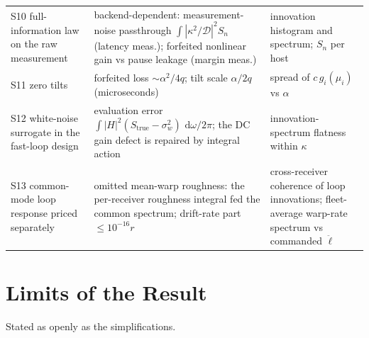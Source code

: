 \documentclass[11pt, a4paper]{article}
\theoremstyle{definition}
\theoremstyle{plain}
\theoremstyle{remark}
\newcommand{\dd}{\,\mathrm{d}}
\begin{document}
\begin{table}[h!]
\begin{tabular}{@{}p{}p{}p{}@{}}
\addlinespace
S10 full-information law on the raw measurement
& backend-dependent: measurement-noise passthrough
  $\int|\kappa^2/\mathcal{D}|^2 S_n$ (latency meas.); forfeited
  nonlinear gain vs pause leakage (margin meas.)
& innovation histogram and spectrum; $S_n$ per host \\
\addlinespace
S11 zero tilts
& forfeited loss $\sim \alpha^2/4q$; tilt scale $\alpha/2q$
  (microseconds)
& spread of $c\,g_i(\mu_i)$ vs $\alpha$ \\
\addlinespace
S12 white-noise surrogate in the fast-loop design
& evaluation error
  $\int|H|^2(S_{\mathrm{true}}-\sigma_w^2)\,\dd\omega/2\pi$; the DC
  gain defect is repaired by integral action
& innovation-spectrum flatness within $\kappa$ \\
\addlinespace
S13 common-mode loop response priced separately
& omitted mean-warp roughness: the per-receiver roughness integral
  fed the common spectrum; drift-rate part $\le 10^{-16}r$
& cross-receiver coherence of loop innovations; fleet-average
  warp-rate spectrum vs commanded $\ddot\ell$ \\
\bottomrule
\end{tabular}
\end{table}

\section{Limits of the Result}\label{sec:limits}

Stated as openly as the simplifications.
\end{document}
